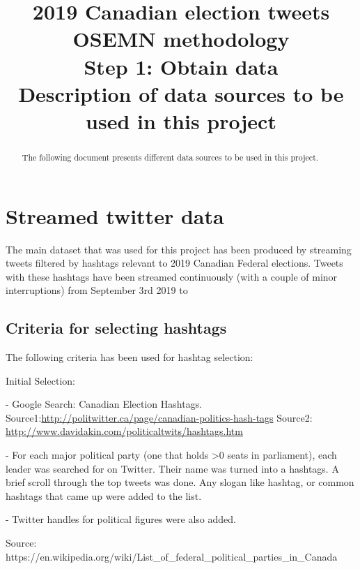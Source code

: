 \documentclass[11pt]{article}
\begin{document}
    \title{2019 Canadian election tweets \\
    OSEMN methodology \\
    Step 1: Obtain data \\
    Description of data sources to be used in this project}

    \maketitle

    \begin{abstract}
        The following document presents different data sources to be used in this project.
    \end{abstract}

    \section{Streamed twitter data} \label{sec:streamed_twitter_data}

    The main dataset that was used for this project has been produced by streaming tweets filtered by hashtags relevant to 2019 Canadian Federal elections.
    Tweets with these hashtags have been streamed continuously (with a couple of minor interruptions) from September 3rd 2019 to %

    \subsection{Criteria for selecting hashtags} \label{subsec:hashtag_selection_criteria}

    The following criteria has been used for hashtag selection:

    Initial Selection:

    - Google Search: Canadian Election Hashtags.
    Source1:\url{http://politwitter.ca/page/canadian-politics-hash-tags}
    Source2: \url{http://www.davidakin.com/politicaltwits/hashtags.htm}

    - For each major political party (one that holds >0 seats in parliament), each leader was searched for on Twitter.
    Their name was turned into a hashtags.
    A brief scroll through the top tweets was done.
    Any slogan like hashtag, or common hashtags that came up were added to the list.

    - Twitter handles for political figures were also added.

    Source: https://en.wikipedia.org/wiki/List_of_federal_political_parties_in_Canada
\end{document}
